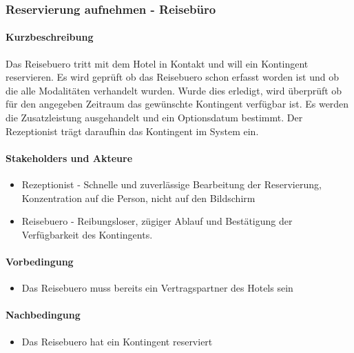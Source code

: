 \subsubsection{Reservierung aufnehmen - Reisebüro}
\label{UseCase_ReservierungAufnehmenReisebüro}

\paragraph{Kurzbeschreibung}  

Das \Gls{Reisebuero} tritt mit dem Hotel in Kontakt und will ein \Gls{Kontingent} reservieren. Es wird geprüft ob das \Gls{Reisebuero} schon erfasst worden ist und ob die alle Modalitäten verhandelt wurden. Wurde dies erledigt, wird überprüft ob für den angegeben Zeitraum das gewünschte \Gls{Kontingent} verfügbar ist. Es werden die \Gls{Zusatzleistung} ausgehandelt und ein \Gls{Optionsdatum} bestimmt. Der \Gls{Rezeptionist} trägt daraufhin das \Gls{Kontingent} im System ein.

\paragraph{Stakeholders und Akteure}
\begin{itemize}
	\item \Gls{Rezeptionist} - Schnelle und zuverlässige Bearbeitung der \Gls{Reservierung}, Konzentration auf die Person, nicht auf den Bildschirm
	\item \Gls{Reisebuero} - Reibungsloser, zügiger Ablauf und Bestätigung der Verfügbarkeit des Kontingents.
\end{itemize}

\paragraph{Vorbedingung}
\begin{itemize}
	\item Das \Gls{Reisebuero} muss bereits ein Vertragspartner des Hotels sein
\end{itemize}

\paragraph{Nachbedingung}
\begin{itemize}
	\item Das \Gls{Reisebuero} hat ein \Gls{Kontingent} reserviert
\end{itemize}

